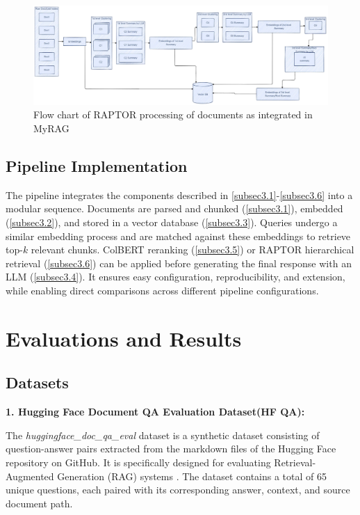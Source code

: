 \documentclass[pdflatex,sn-mathphys-num]{sn-jnl}%
\theoremstyle{thmstyleone}%
\theoremstyle{thmstyletwo}%
\theoremstyle{thmstylethree}%
\begin{document}
\begin{figure}[h]
	\centering
	\includegraphics[width=\linewidth]{Raptor.pdf}
	\caption{Flow chart of RAPTOR processing of documents as integrated in MyRAG}
	\label{fig:raptor}
\end{figure}

\subsection{Pipeline Implementation}\label{subsec3.7}

The pipeline integrates the components described in \ref{subsec3.1}-\ref{subsec3.6} into a modular sequence. Documents are parsed and chunked (\ref{subsec3.1}), embedded (\ref{subsec3.2}), and stored in a vector database (\ref{subsec3.3}). Queries undergo a similar embedding process and are matched against these embeddings to retrieve top-$k$ relevant chunks. ColBERT reranking (\ref{subsec3.5}) or RAPTOR hierarchical retrieval (\ref{subsec3.6}) can be applied before generating the final response with an LLM (\ref{subsec3.4}). It  ensures easy configuration, reproducibility, and extension, while enabling direct comparisons across different pipeline configurations.


\section{Evaluations and Results}\label{sec4}

\subsection{Datasets}\label{sec4.1}

\textbf{1. Hugging Face Document QA Evaluation Dataset(HF QA):}

The \textit{huggingface\_doc\_qa\_eval} dataset is a synthetic dataset consisting of question-answer pairs extracted from the markdown files of the Hugging Face repository on GitHub. It is specifically designed for evaluating Retrieval-Augmented Generation (RAG) systems \cite{huggingface2024docqa}. The dataset contains a total of 65 unique questions, each paired with its corresponding answer, context, and source document path.
\end{document}
